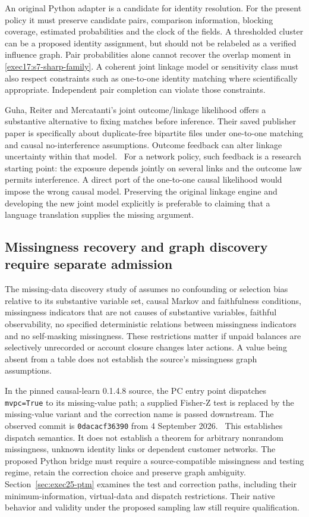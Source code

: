 An original Python adapter is a candidate for identity resolution. For the
present policy it must preserve candidate pairs, comparison information,
blocking coverage, estimated probabilities and the clock of the fields.
A thresholded cluster can be a proposed identity assignment, but should not
be relabeled as a verified influence graph. Pair probabilities alone cannot
recover the overlap moment in \eqref{exec17:s7-sharp-family}. A coherent joint
linkage model or sensitivity class must also respect constraints such as
one-to-one identity matching where scientifically appropriate. Independent
pair completion can violate those constraints.

Guha, Reiter and Mercatanti's joint outcome/linkage likelihood offers a
substantive alternative to fixing matches before inference. Their saved
publisher paper is specifically about duplicate-free bipartite files under
one-to-one matching and causal no-interference assumptions. Outcome feedback
can alter linkage uncertainty within that model.~\citep{guha2022} For a network
policy, such feedback is a research starting point: the exposure depends
jointly on several links and the outcome law permits interference. A direct
port of the one-to-one causal likelihood would impose the wrong causal model.
Preserving the original linkage engine and developing the new joint model
explicitly is preferable to claiming that a language translation supplies the
missing argument.

\subsection{Missingness recovery and graph discovery require separate admission}

The missing-data discovery study of \citet{tu2019} assumes no confounding or
selection bias relative to its substantive variable set, causal Markov and
faithfulness conditions, missingness indicators that are not causes of
substantive variables, faithful observability, no specified deterministic
relations between missingness indicators and no self-masking missingness.
These restrictions matter if unpaid balances are selectively unrecorded or
account closure changes later actions. A value being absent from a table
does not establish the source's missingness graph assumptions.

In the pinned causal-learn 0.1.4.8 source, the PC entry point dispatches
\texttt{mvpc=True} to its missing-value path; a supplied Fisher-Z test is
replaced by the missing-value variant and the correction name is passed
downstream. The observed commit is \texttt{0dacacf36390} from 4 September
2026.~\citep{v12_sw_causallearn} This establishes dispatch semantics. It
does not establish a theorem for arbitrary nonrandom missingness, unknown
identity links or dependent customer networks. The proposed Python bridge
must require a source-compatible missingness and testing regime, retain the
correction choice and preserve graph ambiguity. Section~\ref{sec:exec25-ptm}
examines the test and correction paths, including their minimum-information,
virtual-data and dispatch restrictions. Their native behavior and validity
under the proposed sampling law still require qualification.

